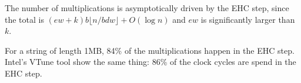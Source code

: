 \documentclass[sigconf, nonacm]{acmart}
\begin{document}
The number of multiplications is asymptotically driven by the EHC step, since the total is $(e w + k) b \lfloor n / b d w \rfloor + O(\log n)$ and $e w$ is significantly larger than $k$.

For a string of length 1MB, 84\% of the multiplications happen in the EHC step. %
Intel's VTune tool show the same thing: 86\% of the clock cycles are spend in the EHC step.







\end{document}
